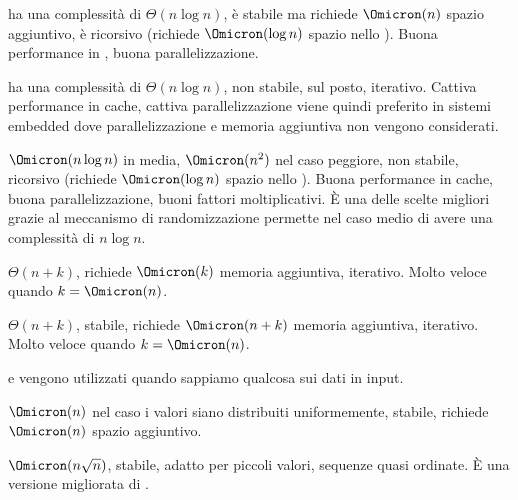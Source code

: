 \mergeSort ha una complessità di \(\Theta(n \log n)\), è stabile ma richiede \(\Omicron(n)\) spazio aggiuntivo, è ricorsivo (richiede \(\Omicron(\log n)\) spazio nello ).
Buona performance in , buona parallelizzazione.

\heapSort ha una complessità di \(\Theta(n \log n)\), non stabile, sul posto, iterativo.
Cattiva performance in cache, cattiva parallelizzazione viene quindi preferito in sistemi embedded dove parallelizzazione e memoria aggiuntiva non vengono considerati.

\quickSort \(\Omicron(n \log n)\) in media, \(\Omicron(n^2)\) nel caso peggiore, non stabile, ricorsivo (richiede \(\Omicron(\log n)\) spazio nello ).
Buona performance in cache, buona parallelizzazione, buoni fattori moltiplicativi.
\`{E} una delle scelte migliori grazie al meccanismo di randomizzazione permette nel caso medio di avere una complessità di \(n \log n\).

\countingSort \(\Theta(n+k)\), richiede \(\Omicron(k)\) memoria aggiuntiva, iterativo.
Molto veloce quando \(k = \Omicron(n)\).

\pigeonholeSort \(\Theta(n+k)\), stabile, richiede \(\Omicron(n+k)\) memoria aggiuntiva, iterativo.
Molto veloce quando \(k = \Omicron(n)\).

\countingSort e \pigeonholeSort vengono utilizzati quando sappiamo qualcosa sui dati in input.

\bucketSort \(\Omicron(n)\) nel caso i valori siano distribuiti uniformemente, stabile, richiede \(\Omicron(n)\) spazio aggiuntivo.

\shellSort \(\Omicron(n \sqrt{n})\), stabile, adatto per piccoli valori, sequenze quasi ordinate.
\`{E} una versione migliorata di \insertionSort.

\ifsubfile

\fi
